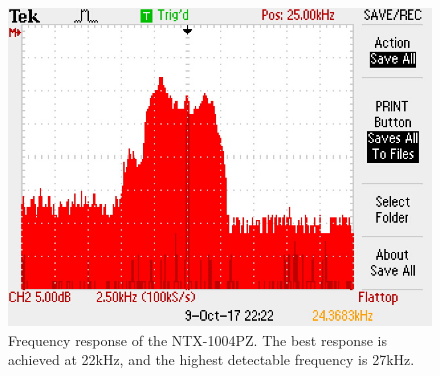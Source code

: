 \documentclass{article}
\begin{document}
      \begin{figure}[H]
        \centering
        \includegraphics[scale=0.75]{./images/frequency_response.JPG}
        \caption{Frequency response of the NTX-1004PZ. The best response is achieved at 22kHz, and the highest detectable frequency is 27kHz.}
        \label{fig:frequency_response}
      \end{figure}
\end{document}
